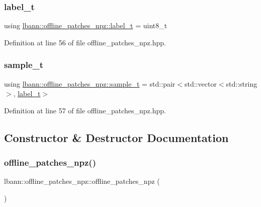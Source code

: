 \subsubsection{\texorpdfstring{label\+\_\+t}{label\_t}}
{\footnotesize\ttfamily using \hyperlink{classlbann_1_1offline__patches__npz_ae0ed6bf62b2be1814964206522ed4e05}{lbann\+::offline\+\_\+patches\+\_\+npz\+::label\+\_\+t} =  uint8\+\_\+t}



Definition at line 56 of file offline\+\_\+patches\+\_\+npz.\+hpp.

\mbox{\label{classlbann_1_1offline__patches__npz_a61405205f907a697515786d0a9e7858a}} 
\subsubsection{\texorpdfstring{sample\+\_\+t}{sample\_t}}
{\footnotesize\ttfamily using \hyperlink{classlbann_1_1offline__patches__npz_a61405205f907a697515786d0a9e7858a}{lbann\+::offline\+\_\+patches\+\_\+npz\+::sample\+\_\+t} =  std\+::pair$<$std\+::vector$<$std\+::string$>$, \hyperlink{classlbann_1_1offline__patches__npz_ae0ed6bf62b2be1814964206522ed4e05}{label\+\_\+t}$>$}



Definition at line 57 of file offline\+\_\+patches\+\_\+npz.\+hpp.



\subsection{Constructor \& Destructor Documentation}
\mbox{\label{classlbann_1_1offline__patches__npz_a6beaea209f8e0e7a70587bbe31d793a0}} 
\subsubsection{\texorpdfstring{offline\+\_\+patches\+\_\+npz()}{offline\_patches\_npz()}}
{\footnotesize\ttfamily lbann\+::offline\+\_\+patches\+\_\+npz\+::offline\+\_\+patches\+\_\+npz (\begin{DoxyParamCaption}{ }\end{DoxyParamCaption})}



